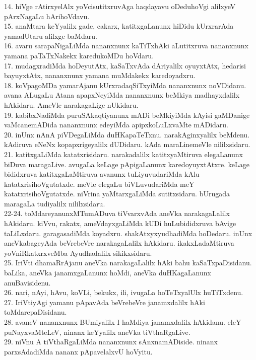\documentclass{article}
\begin{document}
14. hiVge rAtirxyelAlx yoVcisutitxruvAga haqdayavu oDeduhoVgi alilxyeV pArxNagaLu hArihoVdavu.\\
15. anaMtara keYyalilx gade, cakarx, katitxgaLanunx hiDidu kUrxrarAda yamadUtaru alilxge baMdaru.\\
16. avaru sarapaNigaLiMda nananxnunx kaTiTxhAki aLutitxruva nananxnunx yamana paTaTxNakekx karedukoMDu hoVdaru.\\
17. mudagxradiMda hoDeyutAtx, kaSaTxvAda dAriyalilx oyuyxtAtx, hedarisi bayuyxtAtx, nananxnunx yamana muMdakekx karedoyadxru.\\
18. koVpagoMDa yamarAjanu kUrxradaqSiTxyiMda nananxnunx noVDidanu. avana ALugaLu Atana apapxNeyiMda nananxnunx beMkiya madhayxdalilx hAkidaru. AmeVle narakagaLige nUkidaru.\\
19. kabibxNadiMda puruSAkaqtiyanunx mADi beMkiyiMda kAyisi gaMDanige vaMcanemADida nananxnunx edeyiMda apipxkoLuLxvaMte mADidaru.\\
20. inUnx nAnA piVDegaLiMda duHKapaTeTxnu. narakAginxyalilx beMdenu. kAdiruva eNeNx kopapxrigeyalilx dUDidaru. kAda maraLinemeVle nililxsidaru.\\
21. katitxgaLiMda katatxrisidaru. narakadalilx katitxyaMtiruva elegaLanunx biDuva maragaLive. avugaLa keLage pApigaLanunx karedoyuyxtAtxre. keLage bididxruva katitxgaLaMtiruva avanunx tuLiyuvudariMda kAlu katatxrisihoVgutatxde. meVle elegaLu biVLuvudariMda meY katatxrisihoVgutatxde. niVrina yaMtarxgaLiMda sutitxsidaru. bUrugada maragaLa tudiyalilx nililxsidaru.\\
22-24. toMdareyanunxMTumADuva tiVvarxvAda aneVka narakagaLalilx hAkidaru. kiVvu, rakatx, ameVdayxgaLiMda kUDi huLubididxruva bAvige taLiLxdaru. garagasadiMda koyadxru. shakAtxyxyudhadiMda hoDedaru. inUnx aneVkabageyAda beVrebeVre narakagaLalilx hAkidaru. ikakxLadaMtiruva yoVniRkatxrxveMba Ayudhadalilx sikikxsidaru.\\
25. IriVti dhamaRrAjanu aneVka narakagaLalilx hAki bahu kaSaTxpaDisidanu. baLika, aneVka janamxgaLanunx hoMdi, aneVka duHKagaLanunx anuBavisidenu.\\
26. nari, nAyi, hAvu, koVLi, bekukx, ili, ivugaLa hoTeTxyalUlx huTiTxdenu.\\
27. IriVtiyAgi yamanu pApavAda beVrebeVre janamxdalilx hAki toMdarepaDisidanu.\\
28. avaneV nananxnunx BUmiyalilx I haMdiya janamxdalilx hAkidanu. eleY puNayxvaMteLeV, ninanx keYyalilx aneVka tiVthaRgaLive.\\
29. niVnu A tiVthaRgaLiMda nananxnunx sAnxnamADiside. ninanx parxsAdadiMda nananx pApavelalxvU hoVyitu.\\
\end{document}
